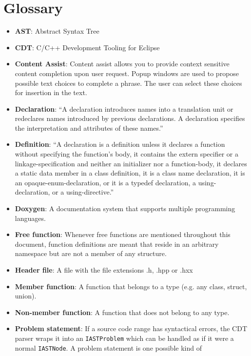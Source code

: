 \chapter{Glossary}
\thispagestyle{fancy}

\begin{itemize}
\item \textbf{AST}: Abstract Syntax Tree
\item \textbf{CDT}: C/C++ Development Tooling for Eclipse
\item \textbf{Content Assist}: Content assist allows you to provide context 
sensitive content completion upon user request. Popup windows are used to 
propose possible text choices to complete a phrase. The user can select these 
choices for insertion in the text. \cite{assist}
\item \textbf{Declaration}: ``A declaration introduces names into a translation 
unit or redeclares names introduced by previous declarations. A declaration 
specifies the interpretation and attributes of these names.''\cite{IsoCpp}
\item \textbf{Definition}: ``A declaration is a definition unless it declares a 
function without specifying the function’s body, it contains the extern 
specifier or a linkage-specification and neither an initializer nor a 
function-body, it declares a static data member in a class definition, it is a 
class name declaration, it is an opaque-enum-declaration, or it is a typedef 
declaration, a using-declaration, or a using-directive.''\cite{IsoCpp}
\item \textbf{Doxygen}: A documentation system that supports multiple 
programming languages.
\item \textbf{Free function}: Whenever free functions are mentioned throughout this document, function definitions are meant that reside in an arbitrary namespace but are not a member of any structure.
\item \textbf{Header file}: A file with the file extensions .h, .hpp or .hxx
\item \textbf{Member function}: A function that belongs to a type (e.g. any 
class, struct, union).
\item \textbf{Non-member function}: A function that does not belong to any type.
\item \textbf{Problem statement}: If a source code range has syntactical errors, 
the CDT parser wraps it into an \texttt{IASTProblem} which can be handled as if 
it were a normal \texttt{IASTNode}. A problem statement is one possible kind of 

\end{itemize}
